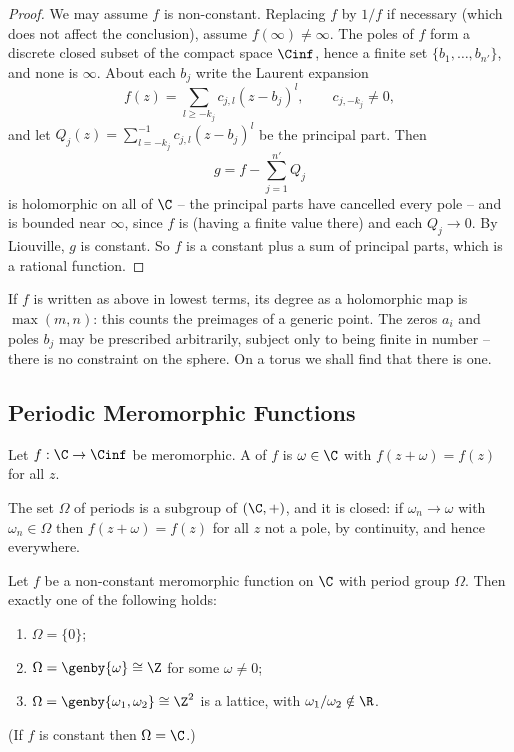 \begin{proof}
	We may assume $f$ is non-constant. Replacing $f$ by $1/f$ if necessary (which does not
	affect the conclusion), assume $f(\infty)\neq\infty$. The poles of $f$ form a discrete
	closed subset of the compact space $\Cinf$, hence a finite set $\{b_1,\dots,b_{n'}\}$,
	and none is $\infty$. About each $b_j$ write the Laurent expansion
	$$
	f(z) = \sum_{l \geq -k_j} c_{j,l}(z-b_j)^l, \qquad c_{j,-k_j}\neq 0,
	$$
	and let $Q_j(z) = \sum_{l=-k_j}^{-1}c_{j,l}(z-b_j)^l$ be the principal part. Then
	$$
	g = f - \sum_{j=1}^{n'} Q_j
	$$
	is holomorphic on all of $\C$ -- the principal parts have cancelled every pole -- and
	is bounded near $\infty$, since $f$ is (having a finite value there) and each $Q_j \to 0$.
	By Liouville, $g$ is constant. So $f$ is a constant plus a sum of principal parts, which
	is a rational function.
\end{proof}

\begin{remark}
	If $f$ is written as above in lowest terms, its degree as a holomorphic map is
	$\max(m,n)$: this counts the preimages of a generic point. The zeros $a_i$ and poles
	$b_j$ may be prescribed arbitrarily, subject only to being finite in number -- there is
	no constraint on the sphere. On a torus we shall find that there is one.
\end{remark}

\subsection{Periodic Meromorphic Functions}

\begin{definition}[Period]
	Let $f : \C \to \Cinf$ be meromorphic. A  of $f$ is $\omega \in \C$ with
	$f(z+\omega) = f(z)$ for all $z$.
\end{definition}

The set $\Omega$ of periods is a subgroup of $(\C,+)$, and it is closed: if
$\omega_n \to \omega$ with $\omega_n \in \Omega$ then $f(z + \omega) = f(z)$ for all $z$
not a pole, by continuity, and hence everywhere.

\begin{lemma}\label{lem:periodgroups}
	Let $f$ be a non-constant meromorphic function on $\C$ with period group $\Omega$.
	Then exactly one of the following holds:
	\begin{enumerate}[label=(\roman*)]
		\item $\Omega = \{0\}$;
		\item $\Omega = \genby{\omega} \cong \Z$ for some $\omega \neq 0$;
		\item $\Omega = \genby{\omega_1,\omega_2} \cong \Z^2$ is a lattice, with
		$\omega_1/\omega_2 \notin \R$.
	\end{enumerate}
	(If $f$ is constant then $\Omega = \C$.)
\end{lemma}

